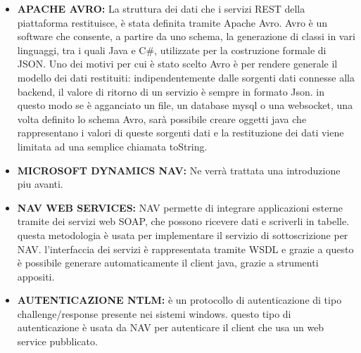 \begin{itemize}
	\item \textbf{APACHE AVRO:} La struttura dei dati che i servizi REST della piattaforma restituisce, è stata definita tramite Apache Avro. Avro è un software che consente, a partire da uno schema, la generazione di classi in vari linguaggi, tra i quali Java e C\#,  utilizzate per la costruzione formale di JSON. Uno dei motivi per cui è stato scelto Avro è per rendere generale il modello dei dati restituiti: indipendentemente dalle sorgenti dati connesse alla backend, il valore di ritorno di un servizio è sempre in formato Json. in questo modo se è agganciato un file, un database mysql o una websocket, una volta definito lo schema Avro, sarà possibile creare oggetti java che rappresentano i valori di queste sorgenti dati e la restituzione dei dati viene limitata ad una semplice chiamata toString.
	\item \textbf{MICROSOFT DYNAMICS NAV:} Ne verrà trattata una introduzione piu avanti.
	\item \textbf{NAV WEB SERVICES:} NAV permette di integrare applicazioni esterne tramite dei servizi web SOAP, che possono ricevere dati e scriverli in tabelle. questa metodologia è usata per implementare il servizio di sottoscrizione per NAV. l’interfaccia dei servizi è rappresentata tramite WSDL e grazie a questo è possibile generare automaticamente il client java, grazie a strumenti appositi.
	\item \textbf{AUTENTICAZIONE NTLM:} è un protocollo di autenticazione di tipo challenge/response presente nei sistemi windows. questo tipo di autenticazione è usata da NAV per autenticare il client che usa un web service pubblicato.
\end{itemize}
\clearpage
